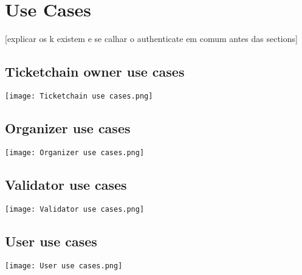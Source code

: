 \section{Use Cases}
\label{sec:use_cases}

[explicar os k existem e se calhar o authenticate em comum antes das sections]

\subsection{Ticketchain owner use cases}

\texttt{[image: Ticketchain use cases.png]}

\subsection{Organizer use cases}

\texttt{[image: Organizer use cases.png]}

\subsection{Validator use cases}

\texttt{[image: Validator use cases.png]}

\subsection{User use cases}

\texttt{[image: User use cases.png]}
